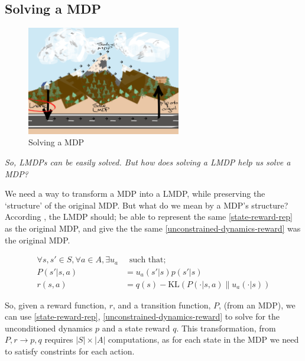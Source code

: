 \subsection{Solving a MDP}

\begin{figure}[h!]
\centering
\includegraphics[width=0.6\textwidth,height=0.3\textheight]{../../pictures/drawings/abstract-representations-linear.png}
\caption{Solving a MDP}
\end{figure}

\begin{displayquote}
\textsl{So, LMDPs can be easily solved. But how does solving a LMDP help us solve a MDP?}
\end{displayquote}

We need a way to transform a MDP into a LMDP, while preserving the
`structure' of the original MDP. But what do we mean by a MDP's structure?
According \cite{Todorov2009}, the LMDP should; be able to represent the same \ref{state-reward-rep} as the original MDP,
and give the the same \ref{unconstrained-dynamics-reward} was the original MDP.

\begin{align*}
\forall s, s' \in S, \forall a \in A, \exists u_a& \;\;\text{such that;} \\
P(s' | s, a) &= u_a(s'|s)p(s'|s) \tag{transition dynamics} \label{state-reward-rep} \\
r(s, a) &= q(s) - \text{KL}(P(\cdot | s, a) \parallel u_a(\cdot| s) ) \label{unconstrained-dynamics-reward} \tag{rewards}
\end{align*}


So, given a reward function, $r$, and a transition function, $P$,
(from an MDP), we can use \ref{state-reward-rep}, \ref{unconstrained-dynamics-reward}
to solve for the unconditioned dynamics $p$ and a state reward $q$.
This transformation, from $P, r \to p, q$ requires $|S| \times |A|$ computations, as for each state in the
MDP we need to satisfy constrints for each action.

